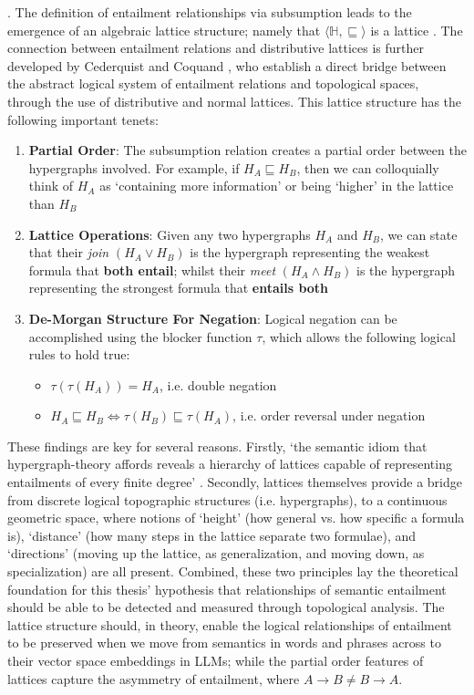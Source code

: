 \documentclass[12pt,twoside]{report}
\begin{document}
. The definition of entailment relationships via subsumption leads to the emergence of an algebraic lattice structure; namely that $\langle\mathbb{H}, \sqsubseteq\rangle$ is a lattice \cite{leibnizianAnalysis}. The connection between entailment relations and distributive lattices is further developed by Cederquist and Coquand \cite{Cederquist}, who establish a direct bridge between the abstract logical system of entailment relations and topological spaces, through the use of distributive and normal lattices. This lattice structure has the following important tenets:
\begin{enumerate}[itemsep=0pt]
    \item \textbf{Partial Order}: The subsumption relation creates a partial order between the hypergraphs involved. For example, if $H_A \sqsubseteq H_B$, then we can colloquially think of $H_A$ as `containing more information' or being `higher' in the lattice than $H_B$
    \item \textbf{Lattice Operations}: Given any two hypergraphs $H_A$ and $H_B$, we can state that their \textit{join} $(H_A \lor H_B)$ is the hypergraph representing the weakest formula that \textbf{both entail}; whilst their \textit{meet} $(H_A \land H_B)$ is the hypergraph representing the strongest formula that \textbf{entails both}
    \item \textbf{De-Morgan Structure For Negation}: Logical negation can be accomplished using the blocker function $\tau$, which allows the following logical rules to hold true:
    \begin{itemize}[topsep=0pt]
        \item $\tau(\tau(H_A)) = H_A$, i.e. double negation
        \item $H_A \sqsubseteq H_B \iff \tau(H_B) \sqsubseteq \tau(H_A)$, i.e. order reversal under negation
    \end{itemize}
\end{enumerate}

These findings are key for several reasons. Firstly, `the semantic idiom that hypergraph-theory affords reveals a hierarchy of lattices capable of representing entailments of every finite degree' \cite{leibnizianAnalysis}. Secondly, lattices themselves provide a bridge from discrete logical topographic structures (i.e. hypergraphs), to a continuous geometric space, where notions of `height' (how general vs. how specific a formula is), `distance' (how many steps in the lattice separate two formulae), and `directions' (moving up the lattice, as generalization, and moving down, as specialization) are all present. Combined, these two principles lay the theoretical foundation for this thesis' hypothesis that relationships of semantic entailment should be able to be detected and measured through topological analysis. The lattice structure should, in theory, enable the logical relationships of entailment to be preserved when we move from semantics in words and phrases across to their vector space embeddings in LLMs; while the partial order features of lattices capture the asymmetry of entailment, where $A \rightarrow B \neq B \rightarrow A$. \newline \par
\end{document}
